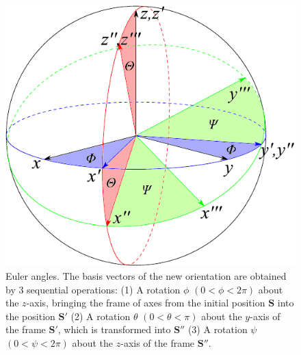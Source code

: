 \begin{enumerate}
\begin{figure}[h]
\begin{centering}
\includegraphics[scale=0.75]{_figure/euler_sphere}
\par\end{centering}
\caption[Euler angles]{Euler angles. The basis vectors of the new orientation are obtained
by 3 sequential operations: (1) A rotation $\phi$ $(0<\phi<2\pi)$
about the $z$-axis, bringing the frame of axes from the initial position
$\mathbf{S}$ into the position $\mathbf{S}'$ (2) A rotation $\theta$
$(0<\theta<\pi)$ about the $y$-axis of the frame $\mathbf{S}'$,
which is transformed into $\mathbf{S}''$ (3) A rotation $\psi$ $(0<\psi<2\pi)$
about the $z$-axis of the frame $\mathbf{S}''$.\label{fig:Euler-angles}}
\end{figure}


\end{enumerate}
